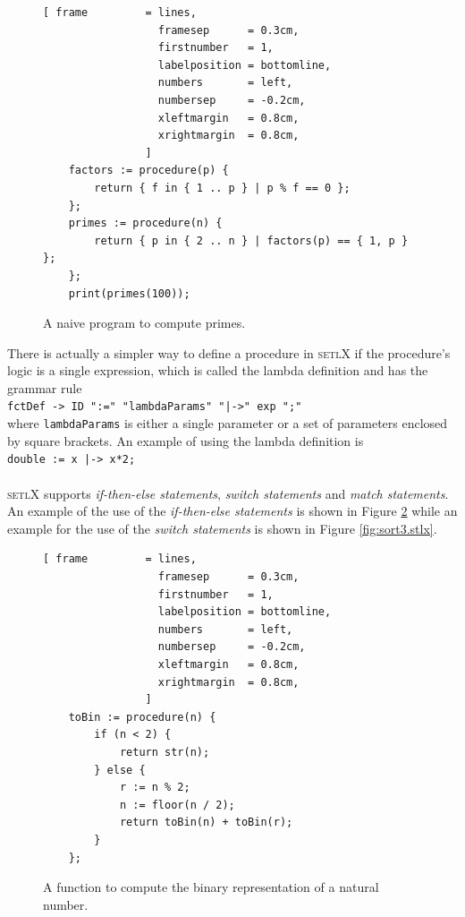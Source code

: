\documentclass[11pt]{report}
\begin{document}
\begin{figure}[!ht]
\centering
\begin{Verbatim}[ frame         = lines, 
                  framesep      = 0.3cm, 
                  firstnumber   = 1,
                  labelposition = bottomline,
                  numbers       = left,
                  numbersep     = -0.2cm,
                  xleftmargin   = 0.8cm,
                  xrightmargin  = 0.8cm,
                ]
    factors := procedure(p) {
        return { f in { 1 .. p } | p % f == 0 };
    };
    primes := procedure(n) {
        return { p in { 2 .. n } | factors(p) == { 1, p } };
    };
    print(primes(100));
\end{Verbatim}
\vspace*{-0.3cm}
\caption{A naive program to compute primes.}
\label{fig:primes-slim.stlx}
\end{figure}

There is actually a simpler way to define a procedure in \textsc{setlX} if the procedure's logic is a single expression, which is called the lambda definition and has the grammar rule
\\[0.2cm]
\hspace*{1.3cm}
\texttt{fctDef -> ID ":=" "lambdaParams" "|->" exp ";"}
\\[0.2cm]
where \texttt{lambdaParams} is either a single parameter or a set of parameters enclosed by square brackets. An example of using the lambda definition is
\\[0.2cm]
\hspace*{1.3cm}
\texttt{double := x |-> x*2;}
\\[0.2cm]
\\

\textsc{setlX} supports \textsl{if-then-else statements}, \textsl{switch statements} and \textsl{match statements}. An example of the use of the \textsl{if-then-else statements} is shown in Figure \ref{fig:toBin.stlx} while an example for the use of the \textsl{switch statements} is shown in Figure \ref{fig:sort3.stlx}.

\begin{figure}[!ht]
\centering
\begin{Verbatim}[ frame         = lines, 
                  framesep      = 0.3cm, 
                  firstnumber   = 1,
                  labelposition = bottomline,
                  numbers       = left,
                  numbersep     = -0.2cm,
                  xleftmargin   = 0.8cm,
                  xrightmargin  = 0.8cm,
                ]
    toBin := procedure(n) {
        if (n < 2) {
            return str(n);
        } else {
            r := n % 2;
            n := floor(n / 2);
            return toBin(n) + toBin(r);
        }
    };
\end{Verbatim}
\vspace*{-0.3cm}
\caption{A function to compute the binary representation of a natural number.}
\label{fig:toBin.stlx}
\end{figure}
\end{document}
